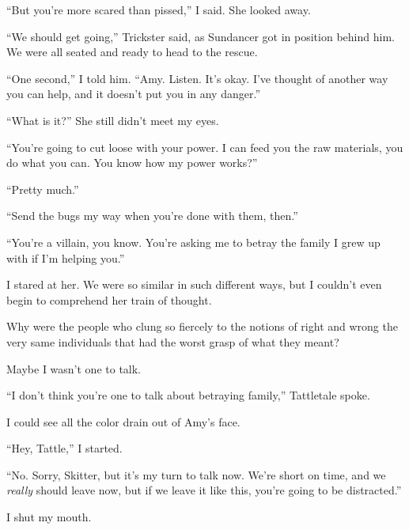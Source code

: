 ``But you're more scared than pissed,'' I said.  She looked away.



``We should get going,'' Trickster said, as Sundancer got in position behind him.  We were all seated and ready to head to the rescue.



``One second,'' I told him.  ``Amy.  Listen.  It's okay.  I've thought of another way you can help, and it doesn't put you in any danger.''



``What is it?''  She still didn't meet my eyes.



``You're going to cut loose with your power.  I can feed you the raw materials, you do what you can.  You know how my power works?''



``Pretty much.''



``Send the bugs my way when you're done with them, then.''



``You're a villain, you know.  You're asking me to betray the family I grew up with if I'm helping you.''



I stared at her.  We were so similar in such different ways, but I couldn't even begin to comprehend her train of thought.



Why were the people who clung so fiercely to the notions of right and wrong the very same individuals that had the worst grasp of what they meant?



Maybe I wasn't one to talk.



``I don't think you're one to talk about betraying family,'' Tattletale spoke.



I could see all the color drain out of Amy's face.



``Hey, Tattle,'' I started.



``No.  Sorry, Skitter, but it's my turn to talk now.  We're short on time, and we \emph{really} should leave now, but if we leave it like this, you're going to be distracted.''



I shut my mouth.



